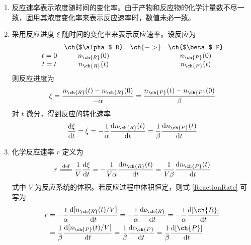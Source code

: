 \begin{enumerate}
    \item 反应速率表示浓度随时间的变化率。由于产物和反应物的化学计量数不尽一致，固用其浓度变化率来表示反应速率时，数值未必一致。
    \item 采用反应进度 $\xi$ 随时间的变化率来表示反应速率。设反应为
    $$\begin{array}{c c c c}
        & \ch{$\alpha$ R} & \ch{->} & \ch{$\beta$ P} \\
        t = 0 & n_{\ch{R}}(0) & & n_{\ch{P}}(0) \\
        t = t & n_{\ch{R}}(t) & & n_{\ch{P}}(t) \\
    \end{array}$$
    则反应进度为
    \begin{equation}
        \xi = \frac{n_{\ch{R}}(t)-n_{\ch{R}}(0)}{-\alpha} = \frac{n_{\ch{P}}(t)-n_{\ch{P}}(0)}{\beta}
    \end{equation}
    对 $t$ 微分，得到反应的转化速率
    \begin{equation}
        \frac{\mathrm{d}\xi}{\mathrm{d}t} = \dot{\xi} 
        = -\frac1{\alpha}\frac{\mathrm{d}n_{\ch{R}}(t)}{\mathrm{d}t}
        = \frac1{\beta} \frac{\mathrm{d}n_{\ch{P}}(t)}{\mathrm{d}t}
    \end{equation}

    \item 化学反应速率 $r$ 定义为
    \begin{equation}
        r \xlongequal{\text{def}} \frac1{V} \frac{\mathrm{d}\xi}{\mathrm{d}t} 
        = -\frac1{V \alpha} \frac{\mathrm{d}n_{\ch{R}}(t)}{\mathrm{d}t} = \frac1{V \beta} \frac{\mathrm{d}n_{\ch{P}}(t)}{\mathrm{d}t}
        \label{ReactionRate}
    \end{equation}
    式中 $V$ 为反应系统的体积。若反应过程中体积恒定，则式 \eqref{ReactionRate} 可写为
    \begin{equation*}
        \begin{aligned}
            r &= -\frac1{\alpha} \frac{\mathrm{d}[n_{\ch{R}}(t)/V]}{\mathrm{d}t} 
            = -\frac1{\alpha} \frac{\mathrm{d}c_{\ch{R}}}{\mathrm{d}t}
            = -\frac1{\alpha} \frac{\mathrm{d}[\ch{R}]}{\mathrm{d}t}\\
            &= \frac1{\beta} \frac{\mathrm{d}[n_{\ch{P}}(t)/V]}{\mathrm{d}t}
            = \frac1{\beta} \frac{\mathrm{d}c_{\ch{P}}}{\mathrm{d}t}
            = \frac1{\beta} \frac{\mathrm{d}[\ch{P}]}{\mathrm{d}t} \\
        \end{aligned}
    \end{equation*}


\end{enumerate}
